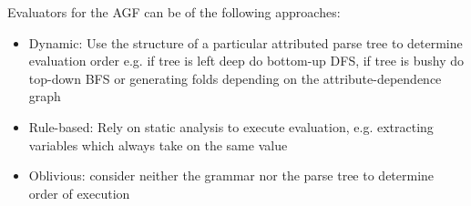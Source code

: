 Evaluators for the AGF can be of the following approaches:
\begin{itemize}
    \item Dynamic: Use the structure of a particular attributed parse tree to determine evaluation order e.g. if tree is left deep do bottom-up DFS, if tree is bushy do top-down BFS or generating folds depending on the attribute-dependence graph
    \item Rule-based: Rely on static analysis to execute evaluation, e.g. extracting variables which always take on the same value
    \item Oblivious: consider neither the grammar nor the parse tree to determine order of execution
\end{itemize}
